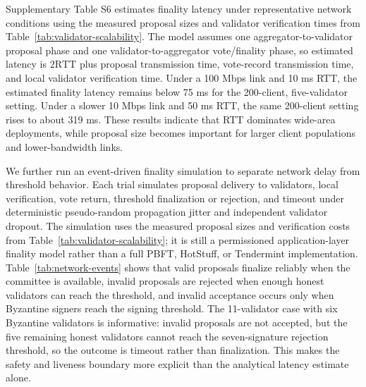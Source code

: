 \documentclass[preprint,12pt]{elsarticle}
\begin{document}
Supplementary Table S6 estimates finality latency under representative network conditions using the measured proposal sizes and validator verification times from Table~\ref{tab:validator-scalability}. The model assumes one aggregator-to-validator proposal phase and one validator-to-aggregator vote/finality phase, so estimated latency is $2\mathrm{RTT}$ plus proposal transmission time, vote-record transmission time, and local validator verification time. Under a 100 Mbps link and 10 ms RTT, the estimated finality latency remains below 75 ms for the 200-client, five-validator setting. Under a slower 10 Mbps link and 50 ms RTT, the same 200-client setting rises to about 319 ms. These results indicate that RTT dominates wide-area deployments, while proposal size becomes important for larger client populations and lower-bandwidth links.

We further run an event-driven finality simulation to separate network delay from threshold behavior. Each trial simulates proposal delivery to validators, local verification, vote return, threshold finalization or rejection, and timeout under deterministic pseudo-random propagation jitter and independent validator dropout. The simulation uses the measured proposal sizes and verification costs from Table~\ref{tab:validator-scalability}; it is still a permissioned application-layer finality model rather than a full PBFT, HotStuff, or Tendermint implementation. Table~\ref{tab:network-events} shows that valid proposals finalize reliably when the committee is available, invalid proposals are rejected when enough honest validators can reach the threshold, and invalid acceptance occurs only when Byzantine signers reach the signing threshold. The 11-validator case with six Byzantine validators is informative: invalid proposals are not accepted, but the five remaining honest validators cannot reach the seven-signature rejection threshold, so the outcome is timeout rather than finalization. This makes the safety and liveness boundary more explicit than the analytical latency estimate alone.
\end{document}
